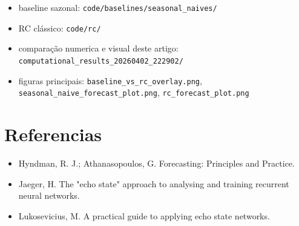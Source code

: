 \documentclass[12pt]{article}
\providecommand{\tightlist}{%
          \setlength{\itemsep}{0pt}\setlength{\parskip}{0pt}}
\begin{document}
\begin{itemize}
\tightlist
\item
  baseline sazonal: \texttt{code/baselines/seasonal\_naives/}
\item
  RC clássico: \texttt{code/rc/}
\item
  comparação numerica e visual deste artigo: \texttt{computational\_results\_20260402\_222902/}
\item
  figuras principais: \texttt{baseline\_vs\_rc\_overlay.png}, \texttt{seasonal\_naive\_forecast\_plot.png}, \texttt{rc\_forecast\_plot.png}
\end{itemize}

\section{Referencias}\label{referencias}

\begin{itemize}
\tightlist
\item
  Hyndman, R. J.; Athanasopoulos, G. Forecasting: Principles and Practice.
\item
  Jaeger, H. The "echo state" approach to analysing and training recurrent neural networks.
\item
  Lukosevicius, M. A practical guide to applying echo state networks.
\end{itemize}

        
\end{document}
